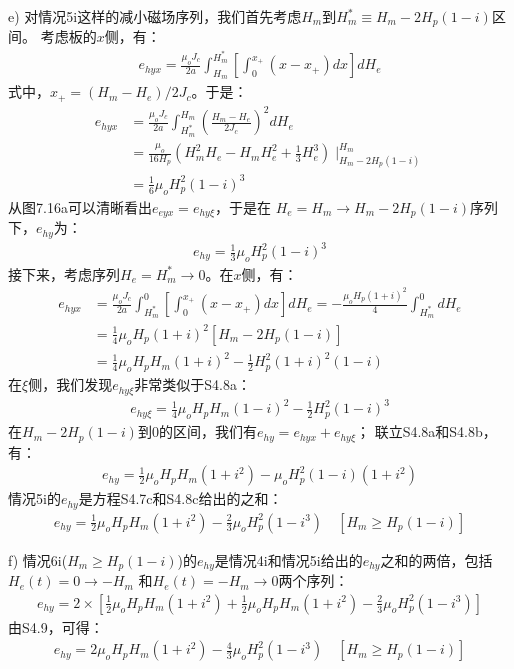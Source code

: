 e) 对情况5i这样的减小磁场序列，我们首先考虑$H_m$到$H_m^*\equiv H_m-2H_p(1-i)$区间。
考虑板的$x$侧，有：
\begin{align*}%
e_{hyx}=\frac{\mu_oJ_c}{2a}\int_{H_m}^{H_{m}^{*}}\left[\int_{0}^{x_+}(x-x_+)dx\right]dH_e \tag{S4.7a}
\end{align*}
式中，$x_+=(H_m-H_e)/2J_c$。于是：
\begin{align*}%
e_{hyx}&=\frac{\mu_oJ_c}{2a}\int_{H_{m}^{*}}^{H_m}\left(\frac{H_m-H_e}{2J_c}\right)^2dH_e \\\tag{S4.7b}
&=\frac{\mu_o}{16H_p}(H_{m}^{2}H_e-H_mH_{e}^{2}+\frac{1}{3}H_{e}^{3})\mid_{H_m-2H_p(1-i)}^{H_m} \\
&=\frac{1}{6}\mu_oH_{p}^{2}(1-i)^3
\end{align*}
从图7.16a可以清晰看出$e_{eyx}=e_{hy\xi}$，于是在
$H_e=H_m\rightarrow H_m-2H_p(1-i)$序列下，$e_{hy}$为：
\begin{align*}%
e_{hy}=\frac{1}{3}\mu_oH_{p}^{2}(1-i)^3 \tag{S4.7c}
\end{align*}
接下来，考虑序列$H_e=H_m^*\rightarrow0$。在$x$侧，有：
\begin{align*}%
e_{hyx}&=\frac{\mu_oJ_c}{2a}\int_{H_{m}^{*}}^{0}\left[\int_{0}^{x_+}(x-x_+)dx\right]dH_e=-\frac{\mu_oH_p(1+i)^2}{4}\int_{H_{m}^{*}}^{0}dH_e \\
&=\frac{1}{4}\mu_oH_p(1+i)^2[H_m-2H_p(1-i)] \\
&=\frac{1}{4}\mu_oH_pH_m(1+i)^2-\frac{1}{2}H_{p}^{2}(1+i)^2(1-i) \tag{S4.8a}
\end{align*}
在$\xi$侧，我们发现$e_{hy\xi}$非常类似于S4.8a：
\begin{align*}%
e_{hy\xi}=\frac{1}{4}\mu_oH_pH_m(1-i)^2-\frac{1}{2}H_{p}^{2}(1-i)^3 \tag{S4.8b}
\end{align*}
在$H_m-2H_p(1-i)$到0的区间，我们有$e_{hy}=e_{hyx}+e_{hy\xi}$；
联立S4.8a和S4.8b，有：
\begin{align*}%
e_{hy}=\frac{1}{2}\mu_oH_pH_m(1+i^2)-\mu_oH_{p}^{2}(1-i)(1+i^2) \tag{S4.8c}
\end{align*}
情况5i的$e_{hy}$是方程S4.7c和S4.8c给出的之和：
\begin{align*}%
e_{hy}=\frac{1}{2}\mu_oH_pH_m(1+i^2)-\frac{2}{3}\mu_oH_{p}^{2}(1-i^3) \quad [H_m\geq H_p(1-i)] \tag{7.23b}
\end{align*}

f) 情况6i($H_m\ge H_p(1-i)$)的$e_{hy}$是情况4i和情况5i给出的$e_{hy}$之和的两倍，包括$H_e(t)=0\rightarrow-H_m$
和$H_e(t)=-H_m\rightarrow 0$两个序列：
\begin{align*}%
e_{hy}=2\times\left[\frac{1}{2}\mu_oH_pH_m(1+i^2)+\frac{1}{2}\mu_oH_pH_m(1+i^2)-\frac{2}{3}\mu_oH_{p}^{2}(1-i^3)\right] \tag{S4.9}
\end{align*}
由S4.9，可得：
\begin{align*}%
e_{hy}=2\mu_oH_pH_m(1+i^2)-\frac{4}{3}\mu_oH_{p}^{2}(1-i^3) \quad [H_m\geq H_p(1-i)] \tag{7.23c}
\end{align*}

